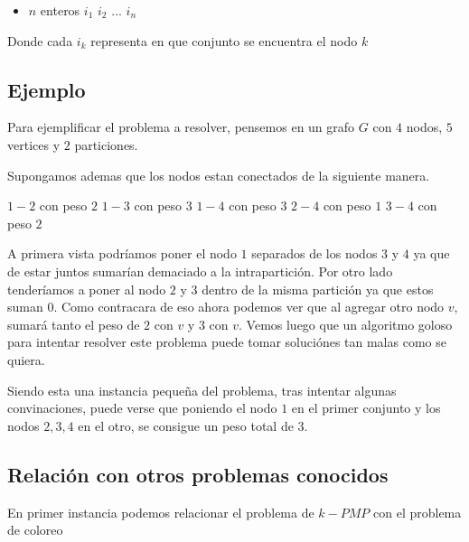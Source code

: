 \begin{itemize}

\item $n$ enteros $i_1$ $i_2$ $...$ $i_n$

\end{itemize}

Donde cada $i_k$ representa en que conjunto se encuentra el nodo $k$

\subsection{Ejemplo}

Para ejemplificar el problema a resolver, pensemos en un grafo $G$ con $4$ nodos, $5$ vertices y $2$ particiones.

Supongamos ademas que los nodos estan conectados de la siguiente manera.

$1-2$ con peso $2$
$1-3$ con peso $3$
$1-4$ con peso $3$
$2-4$ con peso $1$
$3-4$ con peso $2$

A primera vista podríamos poner el nodo $1$ separados de los nodos $3$ y $4$ ya que de estar juntos sumarían demaciado a la intrapartición. Por otro lado tenderíamos a poner al nodo $2$ y $3$ dentro de la misma partición ya que estos suman $0$. Como contracara de eso ahora podemos ver que al agregar otro nodo $v$, sumará tanto el peso de $2$ con $v$ y $3$ con $v$. Vemos luego que un algoritmo goloso para intentar resolver este problema puede tomar soluciónes tan malas como se quiera.

Siendo esta una instancia pequeña del problema, tras intentar algunas convinaciones, puede verse que poniendo el nodo $1$ en el primer conjunto y los nodos $2,3,4$ en el otro, se consigue un peso total de $3$.

\subsection{Relación con otros problemas conocidos}

En primer instancia podemos relacionar el problema de $k-PMP$ con el problema de coloreo 